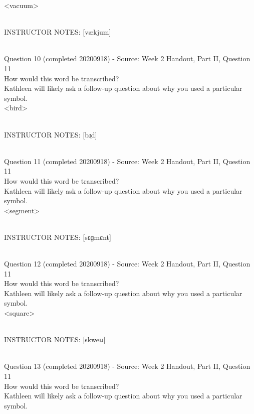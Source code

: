 \documentclass[12pt]{article}
\begin{document}
<vacuum>


~\\
INSTRUCTOR NOTES: [vækjum]


~\\

{\large Question 10} (completed 20200918) - Source: Week 2 Handout, Part II, Question 11\\

How would this word be transcribed?\\ Kathleen will likely ask a follow-up question about why you used a particular symbol.\\

<bird>


~\\
INSTRUCTOR NOTES: [bɹ̩d]


~\\

{\large Question 11} (completed 20200918) - Source: Week 2 Handout, Part II, Question 11\\

How would this word be transcribed?\\ Kathleen will likely ask a follow-up question about why you used a particular symbol.\\

<segment>


~\\
INSTRUCTOR NOTES: [sɛɡmɛnt]


~\\

{\large Question 12} (completed 20200918) - Source: Week 2 Handout, Part II, Question 11\\

How would this word be transcribed?\\ Kathleen will likely ask a follow-up question about why you used a particular symbol.\\

<square>


~\\
INSTRUCTOR NOTES: [skweɪɹ]


~\\

{\large Question 13} (completed 20200918) - Source: Week 2 Handout, Part II, Question 11\\

How would this word be transcribed?\\ Kathleen will likely ask a follow-up question about why you used a particular symbol.\\
\end{document}
